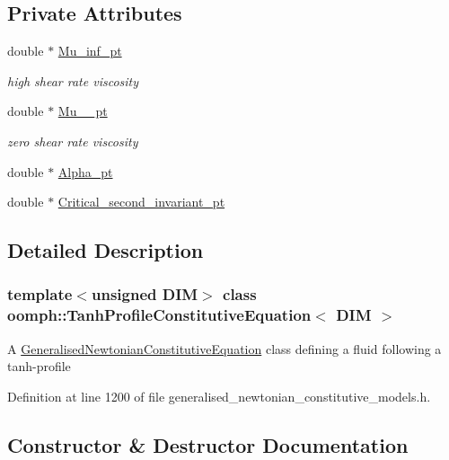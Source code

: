 \subsection*{Private Attributes}
\begin{DoxyCompactItemize}
\item 
double $\ast$ \hyperlink{classoomph_1_1TanhProfileConstitutiveEquation_a34b319c7b3280d633f2dcaccb728498f}{Mu\+\_\+inf\+\_\+pt}
\begin{DoxyCompactList}\small\item\em high shear rate viscosity \end{DoxyCompactList}\item 
double $\ast$ \hyperlink{classoomph_1_1TanhProfileConstitutiveEquation_a8b44ee78c6c9f700107300f1ac6c4652}{Mu\+\_\+\_\+pt}
\begin{DoxyCompactList}\small\item\em zero shear rate viscosity \end{DoxyCompactList}\item 
double $\ast$ \hyperlink{classoomph_1_1TanhProfileConstitutiveEquation_ac131ec2b2026bc93a695d5436e735e14}{Alpha\+\_\+pt}
\item 
double $\ast$ \hyperlink{classoomph_1_1TanhProfileConstitutiveEquation_af08d9a939d835a33e0349def2db64f25}{Critical\+\_\+second\+\_\+invariant\+\_\+pt}
\end{DoxyCompactItemize}


\subsection{Detailed Description}
\subsubsection*{template$<$unsigned D\+IM$>$\newline
class oomph\+::\+Tanh\+Profile\+Constitutive\+Equation$<$ D\+I\+M $>$}

A \hyperlink{classoomph_1_1GeneralisedNewtonianConstitutiveEquation}{Generalised\+Newtonian\+Constitutive\+Equation} class defining a fluid following a tanh-\/profile 

Definition at line 1200 of file generalised\+\_\+newtonian\+\_\+constitutive\+\_\+models.\+h.



\subsection{Constructor \& Destructor Documentation}
\mbox{\label{classoomph_1_1TanhProfileConstitutiveEquation_a18cb572bab5a87ab20220ad009ba82eb}} 
